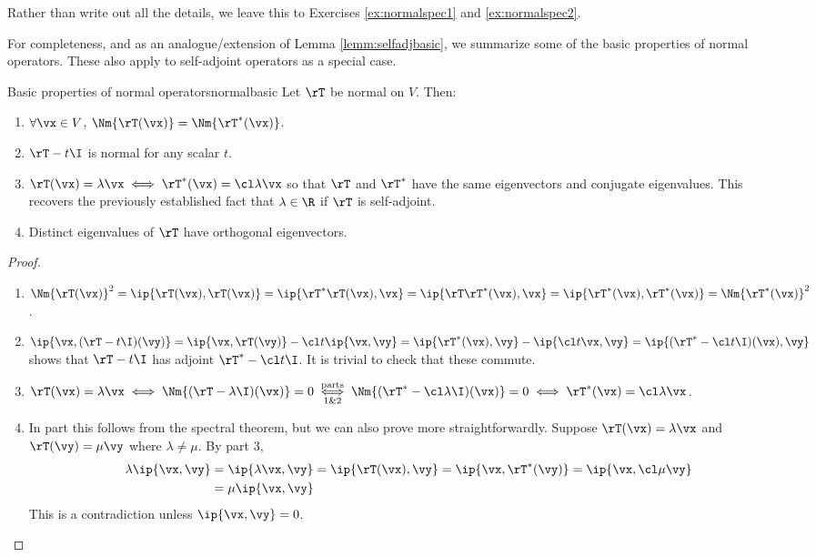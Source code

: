 Rather than write out all the details, we leave this to Exercises \ref{ex:normalspec1} and \ref{ex:normalspec2}.\smallbreak

For completeness, and as an analogue/extension of Lemma \ref{lemm:selfadjbasic}, we summarize some of the basic properties of normal operators. These also apply to self-adjoint operators as a special case.

\begin{lemm}{Basic properties of normal operators}{normalbasic}
Let $\rT$ be normal on $V$. Then:
\begin{enumerate}
  \item $\forall \vx\in V$, $\Nm{\rT(\vx)}=\Nm{\rT^*(\vx)}$.
  \item $\rT-t\I$ is normal for any scalar $t$.
  \item $\rT(\vx)=\lambda\vx\iff \rT^*(\vx)=\cl\lambda\vx$ so that $\rT$ and $\rT^*$ have the same eigenvectors and conjugate eigenvalues. This recovers the previously established fact that $\lambda\in\R$ if $\rT$ is self-adjoint.
  \item Distinct eigenvalues of $\rT$ have orthogonal eigenvectors.
\end{enumerate}
\end{lemm}


\begin{proof}
\begin{enumerate}
  \item $\Nm{\rT(\vx)}^2=\ip{\rT(\vx),\rT(\vx)}=\ip{\rT^*\rT(\vx),\vx} =\ip{\rT\rT^*(\vx),\vx}=\ip{\rT^*(\vx),\rT^*(\vx)}=\Nm{\rT^*(\vx)}^2$.
  \item $\ip{\vx,(\rT-t\I)(\vy)}=\ip{\vx,\rT(\vy)}-\cl t\ip{\vx,\vy} =\ip{\rT^*(\vx),\vy}-\ip{\cl t\vx,\vy} =\ip{(\rT^*-\cl t\I)(\vx),\vy}$ shows that $\rT-t\I$ has adjoint $\rT^*-\cl t\I$. It is trivial to check that these commute.
  \item $\rT(\vx)=\lambda\vx\iff \Nm{(\rT-\lambda \I)(\vx)}=0\underset{1 \& 2}{\overset{\text{parts}}{\iff}} \Nm{(\rT^*-\cl\lambda \I)(\vx)}=0 \iff \rT^*(\vx)=\cl\lambda\vx$.
  \item In part this follows from the spectral theorem, but we can also prove more straightforwardly. Suppose $\rT(\vx)=\lambda\vx$ and $\rT(\vy)=\mu\vy$ where $\lambda\neq \mu$. By part 3,
  \begin{align*}
  \lambda\ip{\vx,\vy} &=\ip{\lambda\vx,\vy} =\ip{\rT(\vx),\vy} =\ip{\vx,\rT^*(\vy)} = \ip{\vx,\cl\mu\vy}\\
    & =\mu\ip{\vx,\vy}
  \end{align*}
  This is a contradiction unless $\ip{\vx,\vy}=0$.\hfill\qedhere
\end{enumerate}
\end{proof}
\vfil\vfil
\goodbreak

